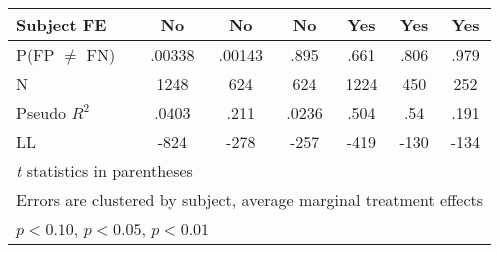 \begin{table}[htbp]
\begin{tabular}{l*{6}{c}}
Subject FE      &       No         &       No         &       No         &      Yes         &      Yes         &      Yes         \\
\hline
P(FP $\neq$ FN)&   .00338         &   .00143         &     .895         &     .661         &     .806         &     .979         \\
N               &     1248         &      624         &      624         &     1224         &      450         &      252         \\
Pseudo $R^2$&    .0403         &     .211         &    .0236         &     .504         &      .54         &     .191         \\
LL  &     -824         &     -278         &     -257         &     -419         &     -130         &     -134         \\
\hline\hline
\multicolumn{7}{l}{\footnotesize \textit{t} statistics in parentheses}\\
\multicolumn{7}{l}{\footnotesize Errors are clustered by subject, average marginal treatment effects}\\
\multicolumn{7}{l}{\footnotesize \sym{*} \(p<0.10\), \sym{**} \(p<0.05\), \sym{***} \(p<0.01\)}\\
\end{tabular}
\end{table}
